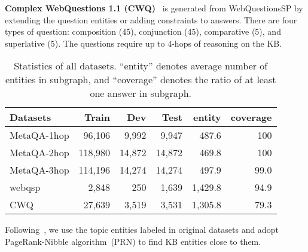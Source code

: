 \textbf{Complex WebQuestions 1.1 (CWQ)}~\citep{CWQ-NAACL-2018} is generated from WebQuestionsSP by extending the question entities or adding constraints to answers. There are four types of question: composition (45), conjunction (45), comparative (5), and superlative (5). The questions require up to 4-hops of reasoning on the KB. 
\begin{table}[!h]
	\centering
	\caption{Statistics of all datasets. ``entity'' denotes average number of entities in subgraph, and ``coverage'' denotes the ratio of at least one answer in subgraph.}
	\label{tab:datasets}\begin{tabular}{l | r r r | r r}
\hline
			Datasets		&	Train&	Dev&	Test&	entity& coverage\\
		\hline
		MetaQA-1hop	&	96,106&	9,992&	 9,947&	487.6&	100\\
		MetaQA-2hop	&	118,980&	14,872&	 14,872&	469.8&	100\\
		MetaQA-3hop	&	114,196&	14,274&	 14,274&	497.9&	99.0\\
		webqsp	&	 2,848&	 250&	  1,639&	1,429.8&	94.9\\
		CWQ	&	27,639&	3,519&	  3,531&	1,305.8&	79.3\\
		\hline
	\end{tabular}\end{table}Following~\citep{GraftNet-EMNLP-2018,PullNet-EMNLP-2019}, we use the topic entities labeled in original datasets and adopt PageRank-Nibble algorithm~(PRN) \citep{PPR-Andersen-2006} to find KB entities close to them.
